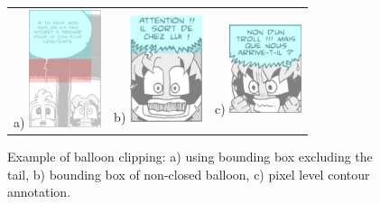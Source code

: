 \begin{figure}[h!]
\begin{center}
\begin{tabular}{ccc}
a) \includegraphics[width=80px]{segBalloon1.png} 
& 
b) \includegraphics[width=80px]{segBalloon2.png}
&
c) \includegraphics[width=80px]{segBalloon3.png}
\end{tabular}
\caption[Speech balloon contour annotation]{Example of balloon clipping: a) using bounding box excluding the tail, b) bounding box of non-closed balloon, c) pixel level contour annotation.} 
\label{fig:gt:segBalloons}
\end{center}
\end{figure}


